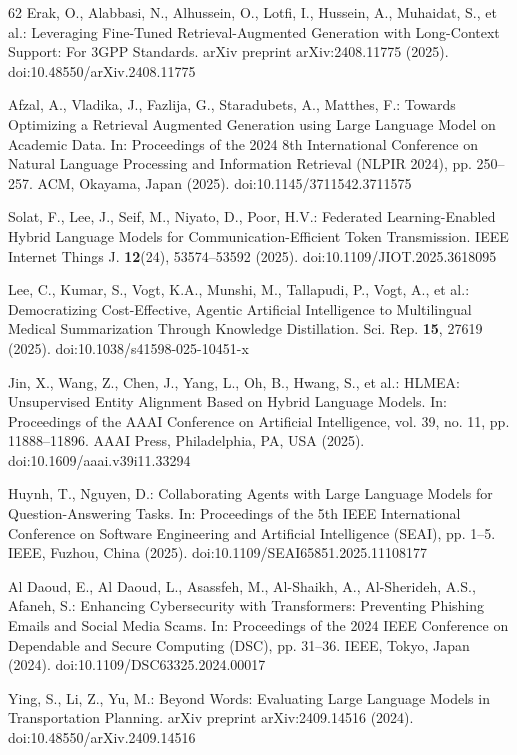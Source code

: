 \begin{thebibliography}{62}
Erak, O., Alabbasi, N., Alhussein, O., Lotfi, I., Hussein, A., Muhaidat, S., et al.: Leveraging Fine-Tuned Retrieval-Augmented Generation with Long-Context Support: For 3GPP Standards. arXiv preprint arXiv:2408.11775 (2025). doi:10.48550/arXiv.2408.11775

Afzal, A., Vladika, J., Fazlija, G., Staradubets, A., Matthes, F.: Towards Optimizing a Retrieval Augmented Generation using Large Language Model on Academic Data. In: Proceedings of the 2024 8th International Conference on Natural Language Processing and Information Retrieval (NLPIR 2024), pp. 250--257. ACM, Okayama, Japan (2025). doi:10.1145/3711542.3711575

Solat, F., Lee, J., Seif, M., Niyato, D., Poor, H.V.: Federated Learning-Enabled Hybrid Language Models for Communication-Efficient Token Transmission. IEEE Internet Things J. \textbf{12}(24), 53574--53592 (2025). doi:10.1109/JIOT.2025.3618095

Lee, C., Kumar, S., Vogt, K.A., Munshi, M., Tallapudi, P., Vogt, A., et al.: Democratizing Cost-Effective, Agentic Artificial Intelligence to Multilingual Medical Summarization Through Knowledge Distillation. Sci. Rep. \textbf{15}, 27619 (2025). doi:10.1038/s41598-025-10451-x

Jin, X., Wang, Z., Chen, J., Yang, L., Oh, B., Hwang, S., et al.: HLMEA: Unsupervised Entity Alignment Based on Hybrid Language Models. In: Proceedings of the AAAI Conference on Artificial Intelligence, vol. 39, no. 11, pp. 11888--11896. AAAI Press, Philadelphia, PA, USA (2025). doi:10.1609/aaai.v39i11.33294

Huynh, T., Nguyen, D.: Collaborating Agents with Large Language Models for Question-Answering Tasks. In: Proceedings of the 5th IEEE International Conference on Software Engineering and Artificial Intelligence (SEAI), pp. 1--5. IEEE, Fuzhou, China (2025). doi:10.1109/SEAI65851.2025.11108177

Al Daoud, E., Al Daoud, L., Asassfeh, M., Al-Shaikh, A., Al-Sherideh, A.S., Afaneh, S.: Enhancing Cybersecurity with Transformers: Preventing Phishing Emails and Social Media Scams. In: Proceedings of the 2024 IEEE Conference on Dependable and Secure Computing (DSC), pp. 31--36. IEEE, Tokyo, Japan (2024). doi:10.1109/DSC63325.2024.00017

Ying, S., Li, Z., Yu, M.: Beyond Words: Evaluating Large Language Models in Transportation Planning. arXiv preprint arXiv:2409.14516 (2024). doi:10.48550/arXiv.2409.14516


\end{thebibliography}
